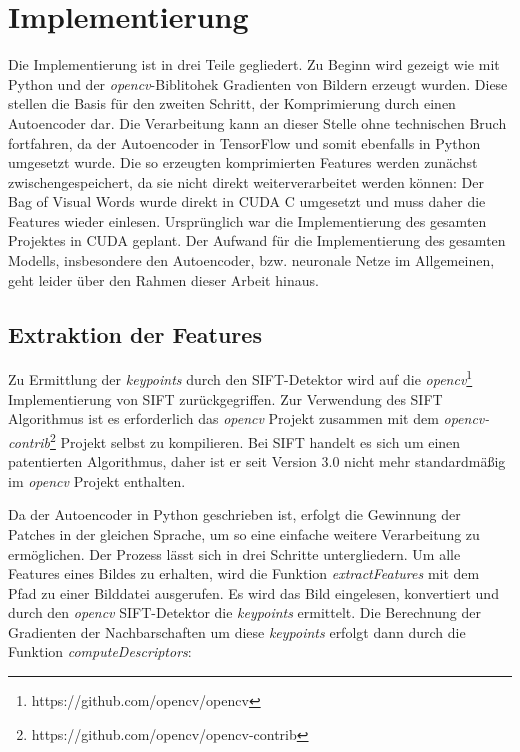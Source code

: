 \chapter{Implementierung}

Die Implementierung ist in drei Teile gegliedert. Zu Beginn wird gezeigt wie mit Python und der \textit{opencv}-Biblitohek Gradienten von Bildern erzeugt wurden. Diese stellen die Basis für den zweiten Schritt, der Komprimierung durch einen Autoencoder dar. Die Verarbeitung kann an dieser Stelle ohne technischen Bruch fortfahren, da der Autoencoder in TensorFlow und somit ebenfalls in Python umgesetzt wurde. Die so erzeugten komprimierten Features werden zunächst zwischengespeichert, da sie nicht direkt weiterverarbeitet werden können: Der Bag of Visual Words wurde direkt in CUDA C umgesetzt und muss daher die Features wieder einlesen. Ursprünglich war die Implementierung des gesamten Projektes in CUDA geplant. Der Aufwand für die Implementierung des gesamten Modells, insbesondere den Autoencoder, bzw. neuronale Netze im Allgemeinen, geht leider über den Rahmen dieser Arbeit hinaus. 

\section{Extraktion der Features}

Zu Ermittlung der \textit{keypoints} durch den SIFT-Detektor wird auf die \textit{opencv}\footnote{https://github.com/opencv/opencv} Implementierung von SIFT zurückgegriffen. Zur Verwendung des SIFT Algorithmus ist es erforderlich das \textit{opencv} Projekt zusammen mit dem \textit{opencv-contrib}\footnote{https://github.com/opencv/opencv-contrib} Projekt selbst zu kompilieren. Bei SIFT handelt es sich um einen patentierten Algorithmus, daher ist er seit Version 3.0 nicht mehr standardmäßig im \textit{opencv} Projekt enthalten.

Da der Autoencoder in Python geschrieben ist, erfolgt die Gewinnung der Patches in der gleichen Sprache, um so eine einfache weitere Verarbeitung zu ermöglichen. Der Prozess lässt sich in drei Schritte untergliedern. Um alle Features eines Bildes zu erhalten, wird die Funktion \textit{extractFeatures} mit dem Pfad zu einer Bilddatei ausgerufen. Es wird das Bild eingelesen, konvertiert und durch den \textit{opencv} SIFT-Detektor die \textit{keypoints} ermittelt. Die Berechnung der Gradienten der Nachbarschaften um diese \textit{keypoints} erfolgt dann durch die Funktion \textit{computeDescriptors}:

